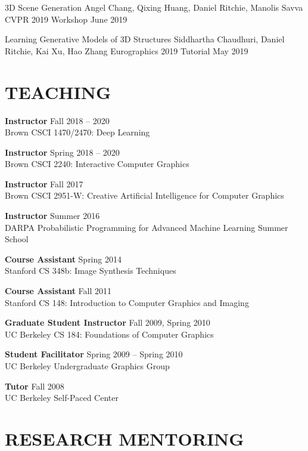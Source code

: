 \documentclass[line,margin]{res}
\begin{document}
\begin{resume}
\workshop
{3D Scene Generation}
{Angel Chang, Qixing Huang, Daniel Ritchie, Manolis Savva}
{CVPR 2019 Workshop}
{June 2019}

\tutorial
{Learning Generative Models of 3D Structures}
{Siddhartha Chaudhuri, Daniel Ritchie, Kai Xu, Hao Zhang}
{Eurographics 2019 Tutorial}
{May 2019}


\section{TEACHING}

\newcommand{\teach}[3] {
	\textbf{#1} \hfill #3\\
	#2
}

\teach
{Instructor}
{Brown CSCI 1470/2470: Deep Learning}
{Fall 2018 -- 2020}

\teach
{Instructor}
{Brown CSCI 2240: Interactive Computer Graphics}
{Spring 2018 -- 2020}

\teach
{Instructor}
{Brown CSCI 2951-W: Creative Artificial Intelligence for Computer Graphics}
{Fall 2017}

\teach
{Instructor}
{DARPA Probabilistic Programming for Advanced Machine Learning Summer School}
{Summer 2016}

\teach
{Course Assistant}
{Stanford CS 348b: Image Synthesis Techniques}
{Spring 2014}

\teach
{Course Assistant}
{Stanford CS 148: Introduction to Computer Graphics and Imaging}
{Fall 2011}

\teach
{Graduate Student Instructor}
{UC Berkeley CS 184: Foundations of Computer Graphics}
{Fall 2009, Spring 2010}

\teach
{Student Facilitator}
{UC Berkeley Undergraduate Graphics Group}
{Spring 2009 -- Spring 2010}

\teach
{Tutor}
{UC Berkeley Self-Paced Center}
{Fall 2008}


\section{RESEARCH MENTORING}

\newcommand{\currentphd}[2] {
	#1 \hfill #2
}

\newcommand{\student}[3] {
	#1 \hfill #2 (expected #3)
}

\newcommand{\alumni}[4] {
	#1 \hfill #2 #3\\
	\emph{Next position: #4}
}


\end{resume}
\end{document}

